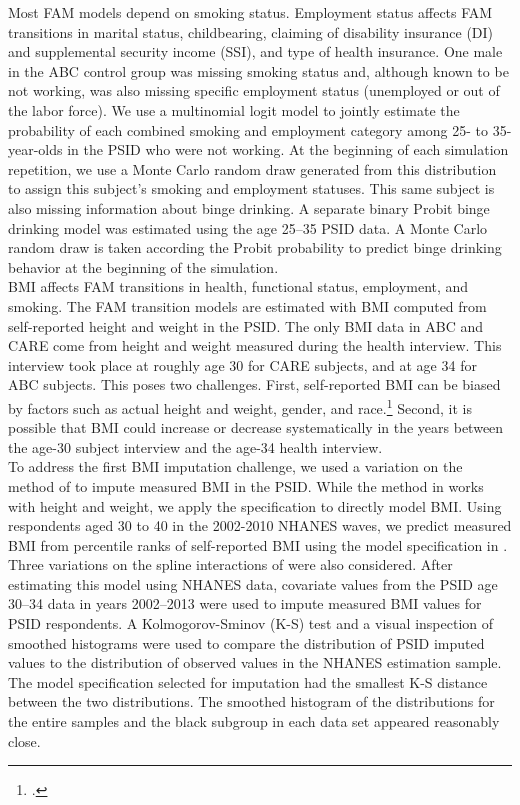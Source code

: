 \noindent Most FAM models depend on smoking status. Employment status affects FAM transitions in marital status, childbearing, claiming of disability insurance (DI) and supplemental security income (SSI), and type of health insurance.
One male in the ABC control group was missing smoking status and, although known to be not working, was also missing specific employment status (unemployed or out of the labor force).
 We use a multinomial logit model to jointly estimate the probability of each combined smoking and employment category among 25- to 35-year-olds in the PSID who were not working. At the beginning of each simulation repetition, we use a Monte Carlo random draw generated from this distribution to assign this subject's smoking and employment statuses. This same subject is also missing information about binge drinking.  A separate binary Probit binge drinking model was estimated using the age 25--35 PSID data. A Monte Carlo random draw is taken according the Probit probability to predict binge drinking behavior at the beginning of the simulation. \\
 
\noindent BMI affects FAM transitions in health, functional status, employment, and smoking.
The FAM transition models are estimated with BMI computed from self-reported height and weight in the PSID.
The only BMI data in ABC and CARE come from height and weight measured during the health interview. This interview took place at roughly age 30 for CARE subjects, and at age 34 for ABC subjects.
This poses two challenges.
First, self-reported BMI can be biased by factors such as actual height and weight, gender, and race.\footnote{\citet{Cawley_2004_JHR}.}
Second, it is possible that BMI could increase or decrease systematically in the years between the age-30 subject interview and the age-34 health interview. \\

\noindent To address the first BMI imputation challenge, we used a variation on the method of \citet*{Courtemanche_etal_2015_Adjusting-Body-Mass} to impute measured BMI in the PSID.
While the method in \citet{Courtemanche_etal_2015_Adjusting-Body-Mass} works with height and weight, we apply the specification to directly model BMI. Using respondents aged 30 to 40 in the 2002-2010 NHANES waves, we predict measured BMI from percentile ranks of self-reported BMI using the model specification in \citet{Courtemanche_etal_2015_Adjusting-Body-Mass}. Three variations 
on the spline interactions of \citet{Courtemanche_etal_2015_Adjusting-Body-Mass} were also considered.  After estimating this model using NHANES data, covariate values from the PSID 
age 30--34 data in years 2002--2013 were used to impute measured BMI values for PSID respondents. A Kolmogorov-Sminov (K-S) test and a visual inspection of smoothed histograms were used to compare the distribution of PSID imputed values to the distribution of observed values in the NHANES estimation sample.  The model specification selected for imputation had the smallest K-S distance between the two distributions.  The smoothed histogram of the distributions for the entire samples and the black subgroup in each data set appeared reasonably close.  \\

